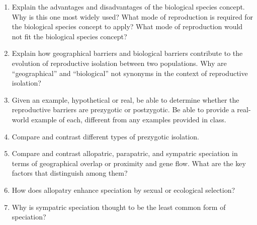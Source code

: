 \documentclass[letterpaper]{tufte-handout}
\begin{document}
\begin{enumerate}
	
	\item Explain the advantages and disadvantages of the biological species concept.  Why is this one most widely used?  What mode of reproduction is required for the biological species concept to apply?  What mode of reproduction would not fit the biological species concept?

\item Explain how geographical barriers and biological barriers contribute to the evolution of reproductive isolation between two populations.  Why are “geographical” and “biological” not synonyms in the context of reproductive isolation?

\item Given an example, hypothetical or real, be able to determine whether the reproductive barriers are prezygotic or postzygotic.  Be able to provide a real-world example of each, different from any examples provided in class.

\item Compare and contrast different types of prezygotic isolation.

\item Compare and contrast allopatric, parapatric, and sympatric speciation in terms of geographical overlap or proximity and gene flow. What are the key factors that distinguish among them?

\item How does allopatry enhance speciation by sexual or ecological selection?

\item Why is sympatric speciation thought to be the least common form of speciation?

\end{enumerate}
\end{document}

